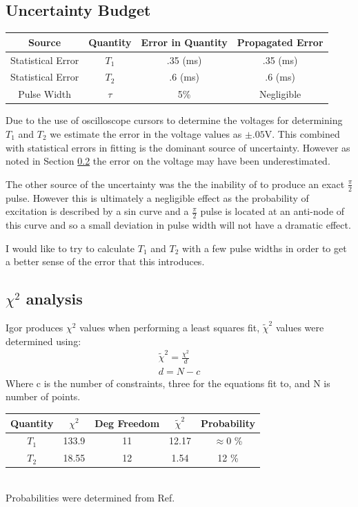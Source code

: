\documentclass[11pt,letterpaper]{article}
\begin{document}
\subsection{Uncertainty Budget}
\begin{table}[!h]
	\begin{center}
		\begin{tabular}{|c|c|c|c|} \hline 
			Source & Quantity&  Error in Quantity  & Propagated Error  \\ \hline \hline
			Statistical Error & $T_1$ & .35 (ms) & .35 (ms)\\ \hline 
			Statistical Error & $T_2$ & .6 (ms)& .6 (ms)\\ \hline
			Pulse Width& $\tau$ & 5\% & Negligible\\
			\hline
		\end{tabular}
	\end{center}
\end{table}
Due to the use of oscilloscope cursors to determine the voltages for determining $T_1$ and $T_2$ we estimate the error in the voltage values as $\pm .05$V. This combined with statistical errors in fitting is the dominant source of uncertainty. However as noted in Section \ref{sec:ChiSq} the error on the voltage may have been underestimated.

The other source of the uncertainty was the the inability of to produce an exact $\frac{\pi}{2}$ pulse. However this is ultimately a negligible effect as the probability of excitation is described by a sin curve and a $\frac{\pi}{2}$ pulse is located at an anti-node of this curve and so a small deviation in pulse width will not have a dramatic effect.

I would like to try to calculate $T_1$ and $T_2$ with a few pulse widths in order to get a better sense of the error that this introduces.
\subsection{$\chi^2$ analysis}
\label{sec:ChiSq}
Igor produces $\chi^2$ values when performing a least squares fit, $\tilde{\chi}^2$ values were determined using:
\begin{align}
\tilde{\chi}^2=\frac{\chi^2}{d}
\\
d=N-c
\end{align}
Where c is the number of constraints, three for the equations fit to, and N is number of points.
\begin{table}[!h]
	\begin{center}
		\begin{tabular}{|c|c|c|c|c|} \hline 
			Quantity & $\chi^2$&Deg Freedom&$\tilde{\chi}^2$  &  Probability \\ \hline \hline
			$T_1$ & 133.9 & 11 & 12.17 &  $\approx0$ \%   \\ \hline 
			$T_2$ & 18.55 & 12 & 1.54 & 12 \%   \\ \hline
		\end{tabular} \\
		Probabilities were determined from Ref. \cite{TaylorError}
	\end{center}
\end{table}
\end{document}
